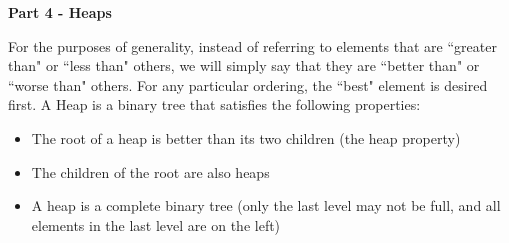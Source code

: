 {\bf Part 4 - Heaps}

For the purposes of generality, instead of referring to 
elements that are ``greater than" or ``less than" others,
we will simply say that they are ``better than" or ``worse than"
others. For any particular ordering, the ``best" element is desired first.
A Heap is a binary tree that satisfies the following properties:

\begin{itemize}
\item The root of a heap is better than its two children (the heap property)
\item The children of the root are also heaps  
\item A heap is a complete binary tree (only the last level may not be full, 
and all elements in the last level are on the left)
\end{itemize}

